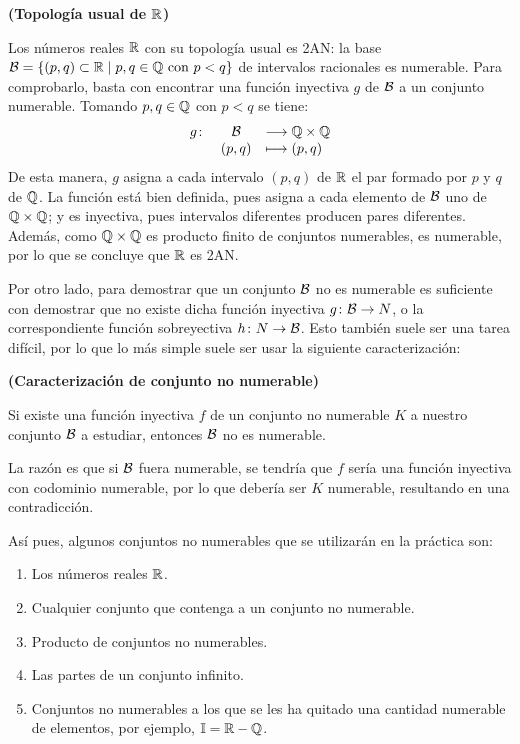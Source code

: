 \begin{ej}
    {\bf (Topología usual de $\mathbb{R}$)} 
    \item Los números reales $\mathbb{R}$ con su topología usual es 2AN: la base $\mathcal{B} = \{(p,q) \subset \mathbb{R} \mid p,q \in \mathbb{Q} \text{ con } p < q\}$ de intervalos racionales es numerable. Para comprobarlo, basta con encontrar una función inyectiva $g$ de $\mathcal{B}$ a un conjunto numerable. Tomando $p,q \in \mathbb{Q}$ con $p < q$ se tiene:
    \[
    \begin{array}{rcl}
        g \colon & \mathcal{B}  & \longrightarrow \mathbb{Q} \times \mathbb{Q} \\
                & (p,q) & \longmapsto     (p,q)
    \end{array}
    \]
    De esta manera, $g$ asigna a cada intervalo $(p,q)$ de $\mathbb{R}$ el par formado por $p$ y $q$ de $\mathbb{Q}$. La función está bien definida, pues asigna a cada elemento de $\mathcal{B}$ uno de $\mathbb{Q} \times \mathbb{Q}$; y es inyectiva, pues intervalos diferentes producen pares diferentes. Además, como $\mathbb{Q} \times \mathbb{Q}$ es producto finito de conjuntos numerables, es numerable, por lo que se concluye que $\mathbb{R}$ es 2AN.
\end{ej}

Por otro lado, para demostrar que un conjunto $\mathcal{B}$ no es numerable es suficiente con demostrar que no existe dicha función inyectiva $g\colon \mathcal{B} \to N$, o la correspondiente función sobreyectiva $h\colon N \to \mathcal{B}$. Esto también suele ser una tarea difícil, por lo que lo más simple suele ser usar la siguiente caracterización:
\begin{prop}
    {\bf (Caracterización de conjunto no numerable)}
    \item Si existe una función inyectiva $f$ de un conjunto no numerable $K$ a nuestro conjunto $\mathcal{B}$ a estudiar, entonces $\mathcal{B}$ no es numerable.
    \item La razón es que si $\mathcal{B}$ fuera numerable, se tendría que $f$ sería una función inyectiva con codominio numerable, por lo que debería ser $K$ numerable, resultando en una contradicción.
\end{prop}

Así pues, algunos conjuntos no numerables que se utilizarán en la práctica son:
\begin{enumerate}[label=--, itemsep=0pt]
    \item Los números reales $\mathbb{R}$.
    \item Cualquier conjunto que contenga a un conjunto no numerable.
    \item Producto de conjuntos no numerables.
    \item Las partes de un conjunto infinito.
    \item Conjuntos no numerables a los que se les ha quitado una cantidad numerable de elementos, por ejemplo, $\mathbb{I} = \mathbb{R} - \mathbb{Q}$.
\end{enumerate}

